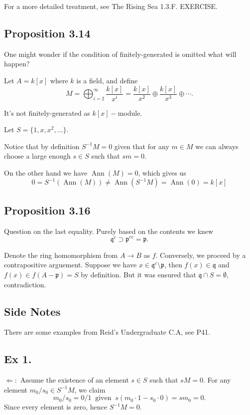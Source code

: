 For a more detailed treatment, see The Rising Sea 1.3.F. EXERCISE.

\subsection{Proposition 3.14}

One might wonder if the condition of finitely-generated is omitted what will happen?

Let $A=k[x]$ where $k$ is a field, and define 
$$M=\bigoplus_{i=2}^{\infty}\frac{k[x]}{x^i}=\frac{k[x]}{x^2}\oplus \frac{k[x]}{x^3}\oplus\cdots.$$

It's not finitely-generated as $k[x]-$module. 

Let $S=\{1,x,x^2,...\}$.

Notice that by definition $S^{-1}M=0$ given that for any $m\in M$ we can always choose a large enough $s\in S$ such that $sm=0$.

On the other hand we have $\operatorname{Ann}(M)=0$, which gives us
$$0=S^{-1}(\operatorname{Ann}(M))\neq \operatorname{Ann}(S^{-1}M)=\operatorname{Ann}(0)=k[x]$$

\subsection{Proposition 3.16} 

Question on the last equality. Purely based on the contents we knew $$\mathfrak q^c \supset \mathfrak p^{ec}=\mathfrak p.$$

Denote the ring homomorphism from $A\to B$ as $f$.
Conversely, we proceed by a contrapositive arguement. Suppose we have $x\in \mathfrak q^c\setminus \mathfrak p$, then $f(x)\in \mathfrak q$ and $f(x)\in f(A-\mathfrak p)=S$ by definition. But it was ensured that $\mathfrak q\cap S=\emptyset$, contradiction.

\subsection{Side Notes}

There are some examples from Reid's Undergraduate C.A, see P41. 

\subsection{Ex 1.}

$\Leftarrow:$ Assume the existence of an element $s\in S$ such that $sM=0$. For any element $m_0/s_0\in S^{-1}M$, we claim 
$$m_0/s_0=0/1 ~\text{ given }~ s(m_0\cdot 1 - s_0\cdot 0)=sm_0=0.$$Since every element is zero, hence $S^{-1}M=0$. 

